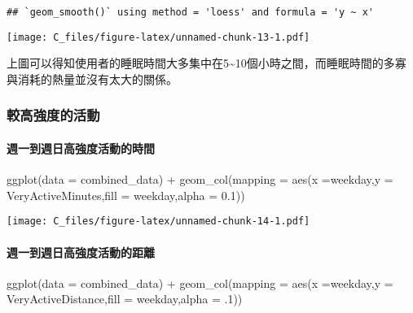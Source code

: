 \documentclass[
]{article}
\newenvironment{Shaded}{\begin{snugshade}}{\end{snugshade}}
\newcommand{\AttributeTok}[1]{\textcolor[rgb]{0.77,0.63,0.00}{#1}}
\newcommand{\DecValTok}[1]{\textcolor[rgb]{0.00,0.00,0.81}{#1}}
\newcommand{\FloatTok}[1]{\textcolor[rgb]{0.00,0.00,0.81}{#1}}
\newcommand{\FunctionTok}[1]{\textcolor[rgb]{0.00,0.00,0.00}{#1}}
\newcommand{\NormalTok}[1]{#1}
\newcommand{\SpecialCharTok}[1]{\textcolor[rgb]{0.00,0.00,0.00}{#1}}
\begin{document}
\begin{verbatim}
## `geom_smooth()` using method = 'loess' and formula = 'y ~ x'
\end{verbatim}

\texttt{[image: C\_files/figure-latex/unnamed-chunk-13-1.pdf]}

上圖可以得知使用者的睡眠時間大多集中在5\textasciitilde10個小時之間，而睡眠時間的多寡與消耗的熱量並沒有太大的關係。

\hypertarget{ux8f03ux9ad8ux5f37ux5ea6ux7684ux6d3bux52d5}{%
\subsubsection{較高強度的活動}\label{ux8f03ux9ad8ux5f37ux5ea6ux7684ux6d3bux52d5}}

\hypertarget{ux9031ux4e00ux5230ux9031ux65e5ux9ad8ux5f37ux5ea6ux6d3bux52d5ux7684ux6642ux9593}{%
\paragraph{週一到週日高強度活動的時間}\label{ux9031ux4e00ux5230ux9031ux65e5ux9ad8ux5f37ux5ea6ux6d3bux52d5ux7684ux6642ux9593}}

\begin{Shaded}
\begin{Highlighting}[]
\FunctionTok{ggplot}\NormalTok{(}\AttributeTok{data =}\NormalTok{ combined\_data) }\SpecialCharTok{+} 
  \FunctionTok{geom\_col}\NormalTok{(}\AttributeTok{mapping =} \FunctionTok{aes}\NormalTok{(}\AttributeTok{x =}\NormalTok{weekday,}\AttributeTok{y =}\NormalTok{ VeryActiveMinutes,}\AttributeTok{fill =}\NormalTok{ weekday,}\AttributeTok{alpha =} \FloatTok{0.1}\NormalTok{))}
\end{Highlighting}
\end{Shaded}

\texttt{[image: C\_files/figure-latex/unnamed-chunk-14-1.pdf]}

\hypertarget{ux9031ux4e00ux5230ux9031ux65e5ux9ad8ux5f37ux5ea6ux6d3bux52d5ux7684ux8dddux96e2}{%
\paragraph{週一到週日高強度活動的距離}\label{ux9031ux4e00ux5230ux9031ux65e5ux9ad8ux5f37ux5ea6ux6d3bux52d5ux7684ux8dddux96e2}}

\begin{Shaded}
\begin{Highlighting}[]
\FunctionTok{ggplot}\NormalTok{(}\AttributeTok{data =}\NormalTok{ combined\_data) }\SpecialCharTok{+} 
  \FunctionTok{geom\_col}\NormalTok{(}\AttributeTok{mapping =} \FunctionTok{aes}\NormalTok{(}\AttributeTok{x =}\NormalTok{weekday,}\AttributeTok{y =}\NormalTok{ VeryActiveDistance,}\AttributeTok{fill =}\NormalTok{ weekday,}\AttributeTok{alpha =}\NormalTok{ .}\DecValTok{1}\NormalTok{))}
\end{Highlighting}
\end{Shaded}
\end{document}
